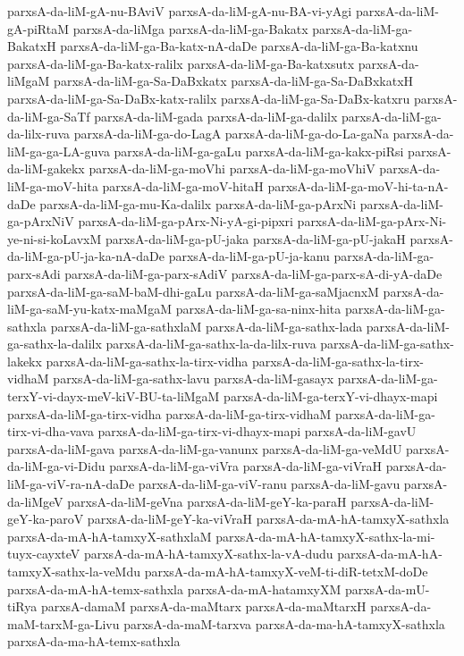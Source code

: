 {parxsA-da-liM-gA-nu-BAviV
parxsA-da-liM-gA-nu-BA-vi-yAgi
parxsA-da-liM-gA-piRtaM
parxsA-da-liMga
parxsA-da-liM-ga-Bakatx
parxsA-da-liM-ga-BakatxH
parxsA-da-liM-ga-Ba-katx-nA-daDe
parxsA-da-liM-ga-Ba-katxnu
parxsA-da-liM-ga-Ba-katx-ralilx
parxsA-da-liM-ga-Ba-katxsutx
parxsA-da-liMgaM
parxsA-da-liM-ga-Sa-DaBxkatx
parxsA-da-liM-ga-Sa-DaBxkatxH
parxsA-da-liM-ga-Sa-DaBx-katx-ralilx
parxsA-da-liM-ga-Sa-DaBx-katxru
parxsA-da-liM-ga-SaTf
parxsA-da-liM-gada
parxsA-da-liM-ga-dalilx
parxsA-da-liM-ga-da-lilx-ruva
parxsA-da-liM-ga-do-LagA
parxsA-da-liM-ga-do-La-gaNa
parxsA-da-liM-ga-ga-LA-guva
parxsA-da-liM-ga-gaLu
parxsA-da-liM-ga-kakx-piRsi
parxsA-da-liM-gakekx
parxsA-da-liM-ga-moVhi
parxsA-da-liM-ga-moVhiV
parxsA-da-liM-ga-moV-hita
parxsA-da-liM-ga-moV-hitaH
parxsA-da-liM-ga-moV-hi-ta-nA-daDe
parxsA-da-liM-ga-mu-Ka-dalilx
parxsA-da-liM-ga-pArxNi
parxsA-da-liM-ga-pArxNiV
parxsA-da-liM-ga-pArx-Ni-yA-gi-pipxri
parxsA-da-liM-ga-pArx-Ni-ye-ni-si-koLavxM
parxsA-da-liM-ga-pU-jaka
parxsA-da-liM-ga-pU-jakaH
parxsA-da-liM-ga-pU-ja-ka-nA-daDe
parxsA-da-liM-ga-pU-ja-kanu
parxsA-da-liM-ga-parx-sAdi
parxsA-da-liM-ga-parx-sAdiV
parxsA-da-liM-ga-parx-sA-di-yA-daDe
parxsA-da-liM-ga-saM-baM-dhi-gaLu
parxsA-da-liM-ga-saMjacnxM
parxsA-da-liM-ga-saM-yu-katx-maMgaM
parxsA-da-liM-ga-sa-ninx-hita
parxsA-da-liM-ga-sathxla
parxsA-da-liM-ga-sathxlaM
parxsA-da-liM-ga-sathx-lada
parxsA-da-liM-ga-sathx-la-dalilx
parxsA-da-liM-ga-sathx-la-da-lilx-ruva
parxsA-da-liM-ga-sathx-lakekx
parxsA-da-liM-ga-sathx-la-tirx-vidha
parxsA-da-liM-ga-sathx-la-tirx-vidhaM
parxsA-da-liM-ga-sathx-lavu
parxsA-da-liM-gasayx
parxsA-da-liM-ga-terxY-vi-dayx-meV-kiV-BU-ta-liMgaM
parxsA-da-liM-ga-terxY-vi-dhayx-mapi
parxsA-da-liM-ga-tirx-vidha
parxsA-da-liM-ga-tirx-vidhaM
parxsA-da-liM-ga-tirx-vi-dha-vava
parxsA-da-liM-ga-tirx-vi-dhayx-mapi
parxsA-da-liM-gavU
parxsA-da-liM-gava
parxsA-da-liM-ga-vanunx
parxsA-da-liM-ga-veMdU
parxsA-da-liM-ga-vi-Didu
parxsA-da-liM-ga-viVra
parxsA-da-liM-ga-viVraH
parxsA-da-liM-ga-viV-ra-nA-daDe
parxsA-da-liM-ga-viV-ranu
parxsA-da-liM-gavu
parxsA-da-liMgeV
parxsA-da-liM-geVna
parxsA-da-liM-geY-ka-paraH
parxsA-da-liM-geY-ka-paroV
parxsA-da-liM-geY-ka-viVraH
parxsA-da-mA-hA-tamxyX-sathxla
parxsA-da-mA-hA-tamxyX-sathxlaM
parxsA-da-mA-hA-tamxyX-sathx-la-mi-tuyx-cayxteV
parxsA-da-mA-hA-tamxyX-sathx-la-vA-dudu
parxsA-da-mA-hA-tamxyX-sathx-la-veMdu
parxsA-da-mA-hA-tamxyX-veM-ti-diR-tetxM-doDe
parxsA-da-mA-hA-temx-sathxla
parxsA-da-mA-hatamxyXM
parxsA-da-mU-tiRya
parxsA-damaM
parxsA-da-maMtarx
parxsA-da-maMtarxH
parxsA-da-maM-tarxM-ga-Livu
parxsA-da-maM-tarxva
parxsA-da-ma-hA-tamxyX-sathxla
parxsA-da-ma-hA-temx-sathxla
}
